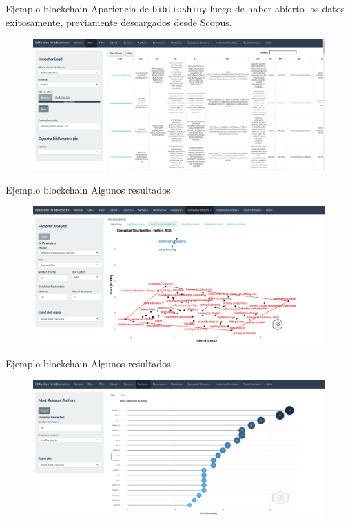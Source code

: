 \documentclass{beamer}
\begin{document}
\begin{frame}{Ejemplo blockchain}
Apariencia de \texttt{biblioshiny} luego de haber abierto los datos exitosamente, previamente descargados desde Scopus.
\begin{figure}
\centering
\includegraphics[width=.95\textwidth]{ejemplo1.png}
\end{figure}  
\end{frame}

\begin{frame}{Ejemplo blockchain}
Algunos resultados
\begin{figure}
\centering
\includegraphics[width=.95\textwidth]{Result1.png}
\end{figure}  
\end{frame}

\begin{frame}{Ejemplo blockchain}
Algunos resultados
\begin{figure}
\centering
\includegraphics[width=.95\textwidth]{Result2.png}
\end{figure}  
\end{frame}
\end{document}
